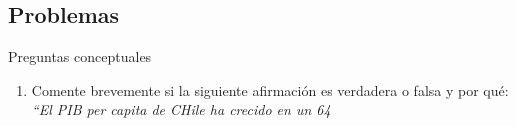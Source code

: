 \subsection{Problemas}

\np

Preguntas conceptuales

\begin{enumerate}[label=\alph*.]
    \item Comente brevemente si la siguiente afirmación es verdadera o falsa y por qué:\\
    \textit{``El PIB per capita de CHile ha crecido en un 64}
\end{enumerate}
